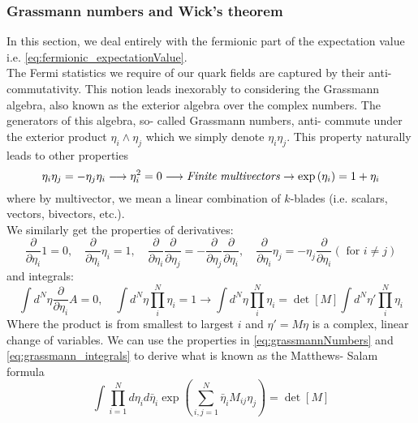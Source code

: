 \documentclass[a4paper,10pt]{article}
\begin{document}
\subsubsection{Grassmann numbers and Wick's theorem}
In this section, we deal entirely with the fermionic part of the expectation value i.e. \eqref{eq:fermionic_expectationValue}.\\The Fermi statistics we require of our quark fields are captured by their anti- commutativity. This notion leads inexorably to considering the Grassmann algebra, also known as the exterior algebra over the complex numbers. The generators of this algebra, so- called Grassmann numbers, anti- commute under the exterior product $\eta_i\wedge\eta_j$ which we simply denote $\eta_i\eta_j$. This property naturally leads to other properties
\begin{equation}\label{eq:grassmannNumbers}
\eta_i\eta_j = -\eta_j\eta_i \longrightarrow \eta_i^2 = 0 \longrightarrow \mathit{Finite  }\hspace{1mm}\mathit{multivectors} \rightarrow \exp\left( \eta_i \right) = 1+\eta_i
\end{equation}
where by multivector, we mean a linear combination of $k$-blades (i.e. scalars, vectors, bivectors, etc.).\\We similarly get the properties of derivatives:
\begin{equation}
\frac{\partial}{\partial \eta_{i}} 1=0, \quad \frac{\partial}{\partial \eta_{i}} \eta_{i}=1, \quad \frac{\partial}{\partial \eta_{i}} \frac{\partial}{\partial \eta_{j}}=-\frac{\partial}{\partial \eta_{j}} \frac{\partial}{\partial \eta_{i}}, \quad \frac{\partial}{\partial \eta_{i}} \eta_{j}=-\eta_{j} \frac{\partial}{\partial \eta_{i}}(\text { for } i \neq j)
\end{equation}
and integrals:
\begin{equation}\label{eq:grassmann_integrals}
\int d^N\eta\frac{\partial}{\partial \eta_i}A = 0, \quad \int d^N\eta \prod\limits_{i}^N\eta_i = 1 \longrightarrow \int d^N\eta \prod\limits_{i}^N\eta_i = \operatorname{det}\left[ M \right]\int d^N\eta' \prod\limits_{i}^N\eta_i
\end{equation}
Where the product is from smallest to largest $i$ and $\eta' = M\eta$ is a complex, linear change of variables. We can use the properties in \eqref{eq:grassmannNumbers} and \eqref{eq:grassmann_integrals} to derive what is known as the Matthews- Salam formula \cite{AIHPA_1979__30_3_193_0}
\begin{equation}\label{eq:Matthews_salam}
\int \prod\limits_{i=1}^Nd\eta_id\bar{\eta}_i \exp\left( \sum\limits_{i,j=1}^N \bar{\eta}_iM_{ij}\eta_j\right) = \operatorname{det}\left[ M \right]
\end{equation}
\end{document}
